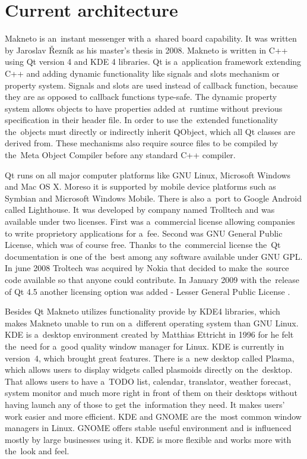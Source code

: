 \section{Current architecture}
Makneto is an~instant messenger with a~shared board capability. It was written by Jaroslav Řezník as his master's thesis in 2008. Makneto is written in C++ using Qt version 4 and KDE 4 libraries. Qt is a~application framework extending C++ and adding dynamic functionality like signals and slots mechanism or property system. Signals and slots are used instead of callback function, because they are as opposed to callback functions type-safe. The dynamic property system allows objects to have properties added at~runtime without previous specification in their header file. In order to use the~extended functionality the~objects must directly or indirectly inherit QObject, which all Qt classes are derived from. These mechanisms also require source files to be compiled by the~Meta Object Compiler before any standard C++ compiler.

Qt runs on all major computer platforms like GNU Linux, Microsoft Windows and Mac OS X. Moreso it is supported by mobile device platforms such as Symbian and Microsoft Windows Mobile. There is also a~port to Google Android called Lighthouse. It was developed by company named Trolltech and was available under two licenses. First was a~commercial license allowing companies to write proprietory applications for a~fee. Second was GNU General Public License, which was of course free. Thanks to the~commercial license the~Qt documentation is one of the~best among any software available under GNU GPL. In june 2008 Troltech was acquired by Nokia that decided to make the~source code available so that anyone could contribute. In January 2009 with the~release of Qt 4.5 another licensing option was added - Lesser General Public License \cite{qtBook,Qt}.

Besides Qt Makneto utilizes functionality provide by KDE4 \cite{KDE} libraries, which makes Makneto unable to run on a~different operating system than GNU Linux. KDE is a~desktop environment created by Matthias Ettricht in 1996 for he felt the~need for a~good quality window manager for Linux. KDE is currently in version~4, which brought great features. There is a~new desktop called Plasma, which allows users to display widgets called plasmoids directly on the~desktop. That allows users to have a~TODO list, calendar, translator, weather forecast, system monitor and much more right in front of them on their desktops without having launch any of those to get the~information they need. It makes users' work easier and more efficient. KDE and GNOME are the~most common window managers in Linux. GNOME offers stable useful environment and is influenced mostly by large businesses using it. KDE is more flexible and works more with the~look and feel.

